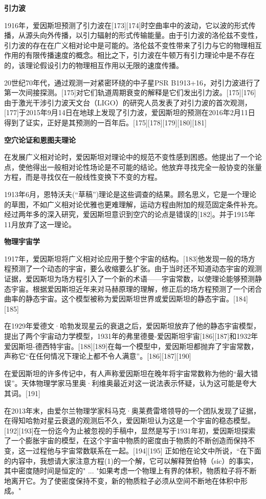 \textbf{引力波}

1916年，爱因斯坦预测了引力波在[173][174]时空曲率中的波动，它以波的形式传播，从源头向外传播，以引力辐射的形式传输能量。由于引力波的洛伦兹不变性，引力波的存在在广义相对论中是可能的。洛伦兹不变性带来了引力与它的物理相互作用的有限传播速度的概念。相比之下，引力波在牛顿万有引力理论中是不存在的，该理论假设引力的物理相互作用以无限的速度传播。

20世纪70年代，通过观测一对紧密环绕的中子星PSR B1913+16，对引力波进行了第一次间接探测。[175]对它们轨道周期衰变的解释是它们发出引力波。[175][176]由于激光干涉引力波天文台（LIGO）的研究人员发表了对引力波的首次观测，[177]于2015年9月14日在地球上发现了引力波，爱因斯坦的预测在2016年2月11日得到了证实，正好是其预测的一百年后。[175][178][179][180][181]

\textbf{空穴论证和恩图夫理论}

在发展广义相对论时，爱因斯坦对理论中的规范不变性感到困惑。他提出了一个论点，使他得出一般相对论性场论是不可能的结论。他放弃寻找完全一般协变的张量方程，而是寻找仅在一般线性变换下不变的方程。

1913年6月，恩特沃夫(“草稿”)理论是这些调查的结果。顾名思义，它是一个理论的草图，不如广义相对论优雅也更难理解，运动方程由附加的规范固定条件补充。经过两年多的深入研究，爱因斯坦意识到空穴的论点是错误的[182]。并于1915年11月放弃了这一理论。

\textbf{物理宇宙学}

1917年，爱因斯坦将广义相对论应用于整个宇宙的结构。[183]他发现一般的场方程预测了一个动态的宇宙，要么收缩要么扩张。由于当时还不知道动态宇宙的观测证据，爱因斯坦为场方程引入了一个新的术语——宇宙常数，以使理论能够预测静态宇宙。根据爱因斯坦近年来对马赫原理的理解，修正后的场方程预测了一个闭合曲率的静态宇宙。这个模型被称为爱因斯坦世界或爱因斯坦的静态宇宙。[184][185]

在1929年爱德文·哈勃发现星云的衰退之后，爱因斯坦放弃了他的静态宇宙模型，提出了两个宇宙动力学模型，1931年的弗里德曼-爱因斯坦宇宙[186][187]和1932年爱因斯坦-德西特宇宙。[188][189]在每一个模型中，爱因斯坦都抛弃了宇宙常数，声称它“在任何情况下理论上都不令人满意”。[186][187][190]

在爱因斯坦的许多传记中，有人声称爱因斯坦在晚年将宇宙常数称为他的“最大错误”。天体物理学家马里奥·利维奥最近对这一说法表示怀疑，认为这可能是夸大其词。[191]

在2013年末，由爱尔兰物理学家科马克·奥莱费雷塔领导的一个团队发现了证据，在得知哈勃对星云衰退的观测后不久，爱因斯坦认为这是一个宇宙的稳态模型。[192][193]在一份迄今为止被忽视的手稿中，显然是写于1931年初，爱因斯坦探索了一个膨胀宇宙的模型，在这个宇宙中物质的密度由于物质的不断创造而保持不变，这一过程他与宇宙常数联系在一起。[194][195] 正如他在论文中所说，“在下面的内容中，我想请大家注意方程(1)的一个解，它可以解释贺伯特（sic）的事实，其中密度随时间是恒定的" ... "如果考虑一个物理上有界的体积，物质粒子将不断地离开它。为了使密度保持不变，新的物质粒子必须从空间不断地在体积中形成。"

